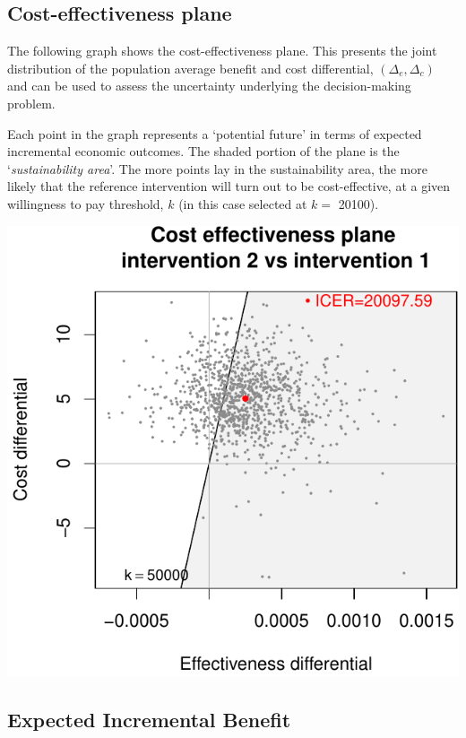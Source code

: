 \documentclass[]{article}
\begin{document}
\hypertarget{cost-effectiveness-plane}{%
\subsection{Cost-effectiveness plane}\label{cost-effectiveness-plane}}

The following graph shows the cost-effectiveness plane. This presents
the joint distribution of the population average benefit and cost
differential, \((\Delta_e,\Delta_c)\) and can be used to assess the
uncertainty underlying the decision-making problem.

Each point in the graph represents a `potential future' in terms of
expected incremental economic outcomes. The shaded portion of the plane
is the `\emph{sustainability area}'. The more points lay in the
sustainability area, the more likely that the reference intervention
will turn out to be cost-effective, at a given willingness to pay
threshold, \(k\) (in this case selected at \(k=\) 20100).

\begin{center}\includegraphics{report_files/figure-latex/unnamed-chunk-3-1} \end{center}

\hypertarget{expected-incremental-benefit}{%
\subsection{Expected Incremental
Benefit}\label{expected-incremental-benefit}}
\end{document}
